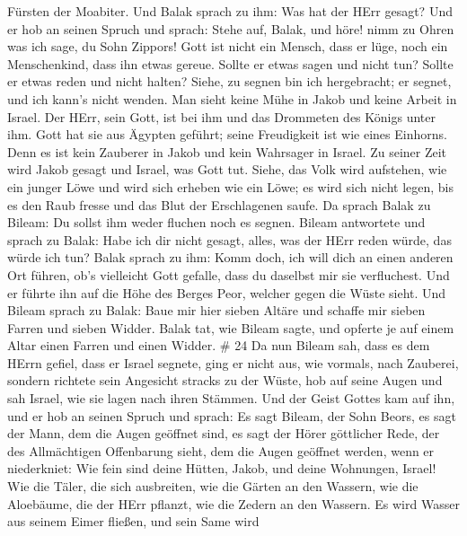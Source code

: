 Fürsten der Moabiter. Und Balak sprach zu ihm: Was hat der HErr gesagt?
 Und er hob an seinen Spruch und sprach: Stehe auf, Balak,
und höre! nimm zu Ohren was ich sage, du Sohn Zippors! 
Gott ist nicht ein Mensch, dass er lüge, noch ein Menschenkind, dass ihn
etwas gereue. Sollte er etwas sagen und nicht tun? Sollte er etwas reden
und nicht halten?  Siehe, zu segnen bin ich hergebracht; er
segnet, und ich kann's nicht wenden.  Man sieht keine Mühe
in Jakob und keine Arbeit in Israel. Der HErr, sein Gott, ist bei ihm
und das Drommeten des Königs unter ihm.  Gott hat sie aus
Ägypten geführt; seine Freudigkeit ist wie eines Einhorns. 
Denn es ist kein Zauberer in Jakob und kein Wahrsager in Israel. Zu
seiner Zeit wird Jakob gesagt und Israel, was Gott tut. 
Siehe, das Volk wird aufstehen, wie ein junger Löwe und wird sich
erheben wie ein Löwe; es wird sich nicht legen, bis es den Raub fresse
und das Blut der Erschlagenen saufe.  Da sprach Balak zu
Bileam: Du sollst ihm weder fluchen noch es segnen.  Bileam
antwortete und sprach zu Balak: Habe ich dir nicht gesagt, alles, was
der HErr reden würde, das würde ich tun?  Balak sprach zu
ihm: Komm doch, ich will dich an einen anderen Ort führen, ob's
vielleicht Gott gefalle, dass du daselbst mir sie verfluchest.
 Und er führte ihn auf die Höhe des Berges Peor, welcher
gegen die Wüste sieht.  Und Bileam sprach zu Balak: Baue
mir hier sieben Altäre und schaffe mir sieben Farren und sieben Widder.
 Balak tat, wie Bileam sagte, und opferte je auf einem
Altar einen Farren und einen Widder. \# 24  Da nun Bileam
sah, dass es dem HErrn gefiel, dass er Israel segnete, ging er nicht
aus, wie vormals, nach Zauberei, sondern richtete sein Angesicht stracks
zu der Wüste,  hob auf seine Augen und sah Israel, wie sie
lagen nach ihren Stämmen. Und der Geist Gottes kam auf ihn, 
und er hob an seinen Spruch und sprach: Es sagt Bileam, der Sohn Beors,
es sagt der Mann, dem die Augen geöffnet sind,  es sagt der
Hörer göttlicher Rede, der des Allmächtigen Offenbarung sieht, dem die
Augen geöffnet werden, wenn er niederkniet:  Wie fein sind
deine Hütten, Jakob, und deine Wohnungen, Israel!  Wie die
Täler, die sich ausbreiten, wie die Gärten an den Wassern, wie die
Aloebäume, die der HErr pflanzt, wie die Zedern an den Wassern.
 Es wird Wasser aus seinem Eimer fließen, und sein Same wird
